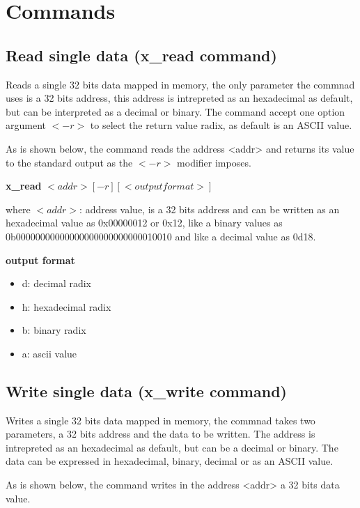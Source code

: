 \documentclass{article}
\begin{document}
\section{Commands}

\subsection{Read single data (x\_read command)}
Reads a single 32 bits data mapped in memory, the only parameter the commnad uses is a 32 bits address, 
this address is intrepreted as an hexadecimal as default, but can be interpreted as a decimal or binary.
The command accept one option argument $<-r>$ to select the return value radix, as default is an ASCII value.

As is shown below, the command reads the address <addr> and returns its value to the standard output as the $<-r>$ modifier 
imposes.

\vspace{5mm}

\textbf{x\_read} $<addr> [-r] [<output format>]$

\vspace{5mm}

where $<addr>$: address value, is a 32 bits address and can be written as an hexadecimal value as 0x00000012 or 0x12, like a 
binary values as 0b00000000000000000000000000010010 and like a decimal value as 0d18.

\textbf{output format}
\begin{itemize}
    \item d: decimal radix
    \item h: hexadecimal radix
    \item b: binary radix
    \item a: ascii value 
\end{itemize}

\subsection{Write single data (x\_write command)}
Writes a single 32 bits data mapped in memory, the commnad takes two parameters, a 32 bits address and the
data to be written. The address is intrepreted as an hexadecimal as default, but can be a decimal or binary.
The data can be expressed in hexadecimal, binary, decimal or as an ASCII value.

As is shown below, the command writes in the address <addr> a 32 bits data value.
\end{document}
